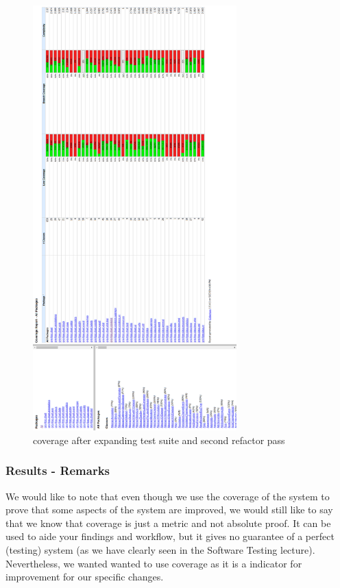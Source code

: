 \documentclass{article}
\begin{document}
\newpage
\begin{figure}[H]
\centering
	\includegraphics[width=0.7\textwidth]{coverage/AFTER_SPASS.png}
	\caption{coverage after expanding test suite and second refactor pass}
\end{figure}

\subsubsection{Results - Remarks}

We would like to note that even though we use the coverage of the system to prove that some aspects of the system are improved, we would still like to say that we know that coverage is just a metric and not absolute proof. It can be used to aide your findings and workflow, but it gives no guarantee of a perfect (testing) system (as we have clearly seen in the Software Testing lecture). Nevertheless, we wanted wanted to use coverage as it is a indicator for improvement for our specific changes.
\end{document}
